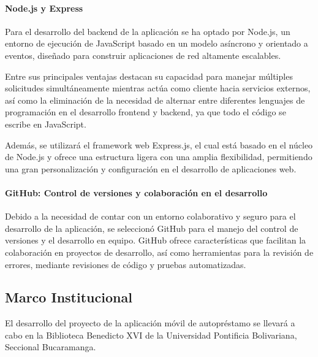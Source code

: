 \documentclass[spanish]{ieee_upb}
\begin{document}
\paragraph{\textbf{Node.js y Express}}
Para el desarrollo del backend de la aplicación se ha optado por Node.js, un entorno de ejecución de JavaScript basado en un modelo asíncrono y orientado a eventos, diseñado para construir aplicaciones de red altamente escalables. \cite{shah2017node} \cite{haro2019desarrollo}
\vspace{0.3 cm}

Entre sus principales ventajas destacan su capacidad para manejar múltiples solicitudes simultáneamente mientras actúa como cliente hacia servicios externos, así como la eliminación de la necesidad de alternar entre diferentes lenguajes de programación en el desarrollo frontend y backend, ya que todo el código se escribe en JavaScript. \cite{shah2017node} \cite{haro2019desarrollo}
\vspace{0.3 cm}

Además, se utilizará el framework web Express.js, el cual está basado en el núcleo de Node.js y ofrece una estructura ligera con una amplia flexibilidad, permitiendo una gran personalización y configuración en el desarrollo de aplicaciones web. \cite{mardan2018using}
\vspace{0.3 cm}


\paragraph{\textbf{GitHub: Control de versiones y colaboración en el desarrollo}
}
Debido a la necesidad de contar con un entorno colaborativo y seguro para el desarrollo de la aplicación, se seleccionó GitHub para el manejo del control de versiones y el desarrollo en equipo. GitHub ofrece características que facilitan la colaboración en proyectos de desarrollo, así como herramientas para la revisión de errores, mediante revisiones de código y pruebas automatizadas. \cite{cosentino2017systematic}

\subsection{Marco Institucional}

El desarrollo del proyecto de la aplicación móvil de autopréstamo se llevará a cabo en la Biblioteca Benedicto XVI de la Universidad Pontificia Bolivariana, Seccional Bucaramanga.
\vspace{0.3 cm}
\end{document}
